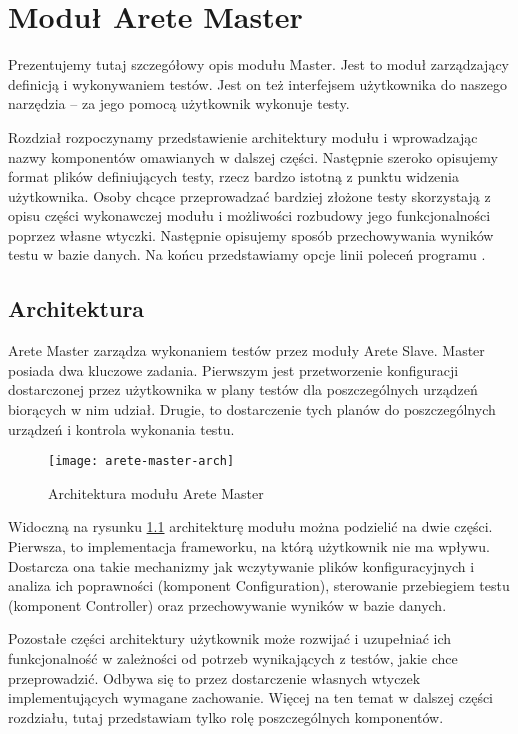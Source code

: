 \documentclass[00-praca-magisterska.tex]{subfiles}
\begin{document}
\chapter{Moduł Arete Master}

Prezentujemy tutaj szczegółowy opis modułu Master. Jest to moduł zarządzający
definicją i wykonywaniem testów. Jest on też interfejsem użytkownika do naszego
narzędzia -- za jego pomocą użytkownik wykonuje testy.

Rozdział rozpoczynamy przedstawienie architektury modułu i wprowadzając nazwy
komponentów omawianych w dalszej części. Następnie szeroko opisujemy format
plików definiujących testy, rzecz bardzo istotną z punktu widzenia użytkownika.
Osoby chcące przeprowadzać bardziej złożone testy skorzystają z opisu części
wykonawczej modułu i możliwości rozbudowy jego funkcjonalności poprzez własne
wtyczki. Następnie opisujemy sposób przechowywania wyników testu w bazie
danych. Na końcu przedstawiamy opcje linii poleceń programu .

\section{Architektura}

Arete Master zarządza wykonaniem testów przez moduły Arete Slave. Master
posiada dwa kluczowe zadania. Pierwszym jest przetworzenie konfiguracji
dostarczonej przez użytkownika w plany testów dla poszczególnych urządzeń
biorących w nim udział. Drugie, to dostarczenie tych planów do poszczególnych
urządzeń i kontrola wykonania testu.

\begin{figure}[htb]
\begin{center}
\leavevmode
\texttt{[image: arete-master-arch]}
\end{center}
\caption{Architektura modułu Arete Master}
\label{fig:arete-master-arch}
\end{figure}

Widoczną na rysunku \ref{fig:arete-master-arch} architekturę modułu można
podzielić na dwie części. Pierwsza, to implementacja frameworku, na którą
użytkownik nie ma wpływu. Dostarcza ona takie mechanizmy jak wczytywanie plików
konfiguracyjnych i analiza ich poprawności (komponent Configuration),
sterowanie przebiegiem testu (komponent Controller) oraz przechowywanie wyników
w bazie danych.

Pozostałe części architektury użytkownik może rozwijać i uzupełniać ich
funkcjonalność w zależności od potrzeb wynikających z testów, jakie chce
przeprowadzić. Odbywa się to przez dostarczenie własnych wtyczek
implementujących wymagane zachowanie. Więcej na ten temat w dalszej części
rozdziału, tutaj przedstawiam tylko rolę poszczególnych komponentów.
\end{document}
